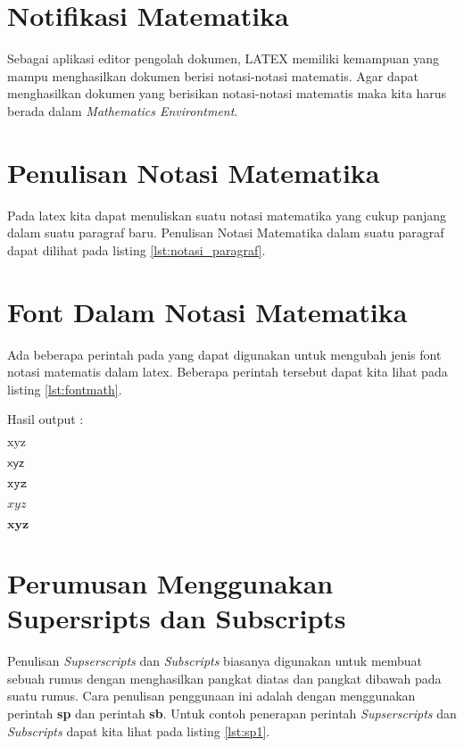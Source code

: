 \section{Notifikasi Matematika}
Sebagai aplikasi editor pengolah dokumen, LATEX memiliki kemampuan yang mampu menghasilkan dokumen berisi notasi-notasi matematis. Agar dapat menghasilkan dokumen yang berisikan notasi-notasi matematis maka kita harus berada dalam \textit{Mathematics Environtment}.

\section{Penulisan Notasi Matematika}
Pada latex kita dapat menuliskan suatu notasi matematika yang cukup panjang dalam suatu paragraf baru. Penulisan Notasi Matematika dalam suatu paragraf dapat dilihat pada listing \ref{lst:notasi_paragraf}.


\section{Font Dalam Notasi Matematika}
Ada beberapa perintah pada yang dapat digunakan untuk mengubah jenis font notasi matematis dalam latex. Beberapa perintah tersebut dapat kita lihat pada listing \ref{lst:fontmath}.


Hasil output : 

$\mathrm{x y z}$

$\mathsf{x y z}$

$\mathtt{x y z}$

$\mathit{x y z}$

$\mathbf{x y z}$

\section{Perumusan Menggunakan Supersripts dan Subscripts}
Penulisan \textit{Supserscripts} dan \textit{Subscripts} biasanya digunakan untuk membuat sebuah rumus dengan menghasilkan pangkat diatas dan pangkat dibawah pada suatu rumus. Cara penulisan penggunaan ini adalah dengan menggunakan perintah \textbf{sp} dan perintah \textbf{sb}. Untuk contoh penerapan perintah \textit{Supserscripts} dan \textit{Subscripts} dapat kita lihat pada listing \ref{lst:sp1}.



